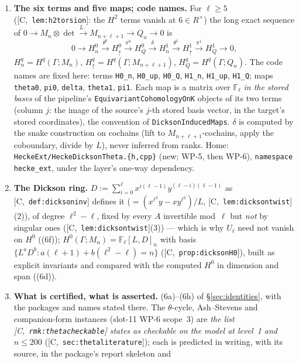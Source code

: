\documentclass[11pt]{article}
\theoremstyle{remark}
\newcommand{\F}{\mathbb{F}}
\newcommand{\Ga}{\Gamma}
\newcommand{\Fl}{\F_\ell}
\newcommand{\Mn}{M_n}
\newcommand{\HA}[1]{[C,~\texttt{#1}]}      %
\begin{document}
\begin{enumerate}[label=(\alph*)]
  ((6a) of \S\ref{sec:identities}) on seeded invertible \emph{and singular} $A$ and on every
  relation matrix, because WP-6 applies $U_\ell$, whose representatives are singular mod~$\ell$, on
  all six terms.
\item \textbf{The six terms and five maps; code names.} For $\ell\ge5$ (\HA{lem:h2torsion}: the
  $H^2$ terms vanish at $6\in R^\times$) the long exact sequence of
  $0\to\Mn\otimes\det\xrightarrow{L\cdot}M_{n+\ell+1}\to Q_n\to0$ is
  \[
    0\to H^0_n\xrightarrow{\ \theta^0\ }H^0_{\uparrow}\xrightarrow{\ \pi^0\ }H^0_{Q}
    \xrightarrow{\ \delta\ }H^1_n\xrightarrow{\ \theta^1\ }H^1_{\uparrow}
    \xrightarrow{\ \pi^1\ }H^1_{Q}\to0,
  \]
  $H^q_n=H^q(\Ga;\Mn)$, $H^q_\uparrow=H^q(\Ga;M_{n+\ell+1})$, $H^q_Q=H^q(\Ga;Q_n)$. The code names
  are fixed here: terms \texttt{H0\_n}, \texttt{H0\_up}, \texttt{H0\_Q}, \texttt{H1\_n},
  \texttt{H1\_up}, \texttt{H1\_Q}; maps \texttt{theta0}, \texttt{pi0}, \texttt{delta},
  \texttt{theta1}, \texttt{pi1}. Each map is a matrix over $\Fl$ \emph{in the stored bases} of the
  pipeline's \texttt{EquivariantCohomologyOnK} objects of its two terms (column $j$: the image of
  the source's $j$-th stored basis vector, in the target's stored coordinates), the convention of
  \texttt{DicksonInducedMaps}. $\delta$ is computed by the snake construction on cochains (lift
  to $M_{n+\ell+1}$-cochains, apply the coboundary, divide by $L$), never inferred from ranks.
  Home: \texttt{HeckeExt/HeckeDicksonTheta.\{h,cpp\}} (new; WP-5, then WP-6), \texttt{namespace
  hecke\_ext}, under the layer's one-way dependency.
\item \textbf{The Dickson ring.} $D:=\sum_{i=0}^{\ell}x^{i(\ell-1)}y^{(\ell-i)(\ell-1)}$ as
  \HA{def:dicksoninv} defines it ($=(x^{\ell^2}y-xy^{\ell^2})/L$, \HA{lem:dicksontwist}(2)), of
  degree $\ell^2-\ell$, fixed by every $A$ invertible mod~$\ell$ but \emph{not} by singular ones
  (\HA{lem:dicksontwist}(3)) --- which is why $U_\ell$ need not vanish on $H^0$ ((6f));
  $H^0(\Ga;\Mn)=\Fl[L,D]_n$ with basis $\{L^aD^b:a(\ell+1)+b(\ell^2-\ell)=n\}$
  (\HA{prop:dicksonH0}), built as explicit invariants and compared with the computed $H^0$ in
  dimension and span ((6d)).
\item \textbf{What is certified, what is asserted.} (6a)--(6h) of \S\ref{sec:identities}, with the
  packages and names stated there. The $\theta$-cycle, Ash--Stevens and companion-form instances
  (slot-11 WP-6 scope~3) are \emph{the list \HA{rmk:thetacheckable} states as checkable on the
  model at level~1 and $n\le200$} (\HA{sec:thetaliterature}); each is predicted in writing, with its source, in the package's report skeleton and

\end{enumerate}
\end{document}
